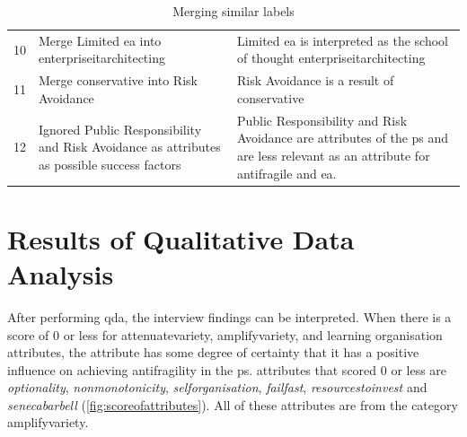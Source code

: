 \begin{table}[H]
{\begin{tabular}{p{}p{}p{}}
			10    & Merge Limited \acrshort{ea} into \gls{enterpriseitarchitecting} & Limited \acrshort{ea} is interpreted as the school of thought \gls{enterpriseitarchitecting} \\%
			11    & Merge conservative into Risk Avoidance & Risk Avoidance is a result of conservative \\%
			12	  & Ignored Public Responsibility and Risk Avoidance as \glspl{attribute} as possible success factors & Public Responsibility and Risk Avoidance are attributes of the \gls{ps} and are less relevant as an attribute for \gls{antifragile} and \acrshort{ea}. \\%
			\bottomrule %
		\end{tabular}%
	}%
	\caption{Merging similar labels}
	\label{tab:prepmergingsimilarlabels}%
\end{table}%
\section{Results of Qualitative Data Analysis}
\label{sec:resultsofqda}
After performing \acrfull{qda}, the interview findings can be interpreted. When there is a score of 0 or less for \gls{attenuatevariety}, \gls{amplifyvariety}, and learning organisation \glspl{attribute}, the \gls{attribute} has some degree of certainty that it has a positive influence on achieving \gls{antifragility} in the \gls{ps}. \Glspl{attribute} that scored 0 or less are \textit{\gls{optionality}}, \textit{\gls{nonmonotonicity}}, \textit{\gls{selforganisation}}, \textit{\gls{failfast}}, \textit{\gls{resourcestoinvest}} and \textit{\gls{senecabarbell}} (\cref{fig:scoreofattributes}). All of these \glspl{attribute} are from the category \gls{amplifyvariety}.

